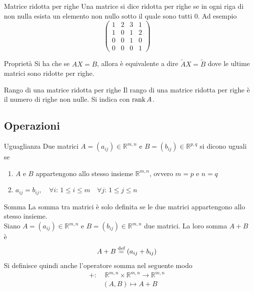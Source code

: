 \begin{Def}{Matrice ridotta per righe}
  Una matrice si dice ridotta per righe se in ogni riga di non nulla esista un elemento
  non nullo sotto il quale sono tutti $0$. Ad esempio
  \begin{equation*}
    \begin{pmatrix}
      1 & 2 & 3 & 1\\
      1 & 0 & 1 & 2\\
      0 & 0 & 1 & 0\\
      0 & 0 & 0 & 1
    \end{pmatrix}
  \end{equation*}
\end{Def}

\begin{SubDef}{Proprietà}
  Si ha che se $AX=B$, allora è equivalente a dire $\widetilde{A}X=\widetilde{B}$ dove
  le ultime matrici sono ridotte per righe.
\end{SubDef}

\begin{Def}{Rango di una matrice ridotta per righe}
  Il rango di una matrice ridotta per righe è il numero di righe non nulle. Si indica
  con $\rank A$.
\end{Def}

\subsection{Operazioni}%
\label{sub:operazioni}

\begin{Def}{Uguaglianza}
  Due matrici $A=(a_{ij})\in\mathbb{R}^{m,n}$ e $B=(b_{ij})\in\mathbb{R}^{p,q}$ si dicono
  uguali se
  \begin{enumerate}
    \item $A$ e $B$ appartengono allo stesso insieme $\mathbb{R}^{m,n}$, ovvero $m=p$ e
      $n=q$
    \item $a_{ij} = b_{ij},\quad\forall i:\,1\leq i\leq m \quad\forall j:\,1\leq j\leq n$
  \end{enumerate}
\end{Def}

\begin{Def}{Somma}\label{def:matrice_somma}
  La somma tra matrici è solo definita se le due matrici appartengono allo stesso
  insieme.\\
  Siano $A=(a_{ij})\in\mathbb{R}^{m,n}$ e $B=(b_{ij})\in\mathbb{R}^{m,n}$ due matrici.
  La loro somma $A+B$ è
  \begin{equation*}
    A+B\overset{\text{def}}{=} (a_{ij}+b_{ij})
  \end{equation*}
  Si definisce quindi anche l'operatore somma nel seguente modo
  \begin{align*}
    +:&\;\mathbb{R}^{m,n}\times\mathbb{R}^{m,n}\rightarrow\mathbb{R}^{m,n}\\
      & (A,B)\mapsto A+B
  \end{align*}
\end{Def}

